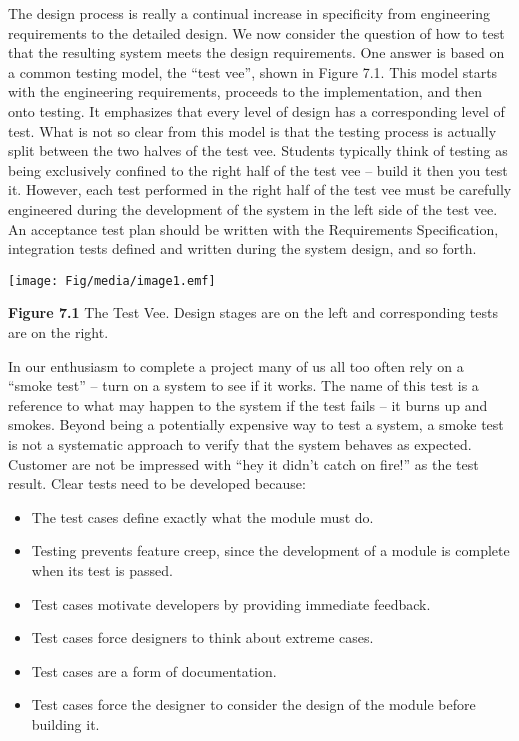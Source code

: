 The design process is really a continual increase in specificity from
engineering requirements to the detailed design. We now consider the
question of how to test that the resulting system meets the design
requirements. One answer is based on a common testing model, the ``test
vee'', shown in Figure 7.1. This model starts with the engineering
requirements, proceeds to the implementation, and then onto testing. It
emphasizes that every level of design has a corresponding level of test.
What is not so clear from this model is that the testing process is
actually split between the two halves of the test vee. Students
typically think of testing as being exclusively confined to the right
half of the test vee -- build it then you test it. However, each test
performed in the right half of the test vee must be carefully engineered
during the development of the system in the left side of the test vee.
An acceptance test plan should be written with the Requirements
Specification, integration tests defined and written during the system
design, and so forth.

\texttt{[image: Fig/media/image1.emf]}

\textbf{Figure 7.1} The Test Vee. Design stages are on the left and
corresponding tests are on the right.

In our enthusiasm to complete a project many of us all too often rely on
a ``smoke test'' -- turn on a system to see if it works. The name of
this test is a reference to what may happen to the system if the test
fails -- it burns up and smokes. Beyond being a potentially expensive
way to test a system, a smoke test is not a systematic approach to
verify that the system behaves as expected. Customer are not be
impressed with ``hey it didn't catch on fire!'' as the test result.
Clear tests need to be developed because:

\begin{itemize}
\item
  The test cases define exactly what the module must do.
\item
  Testing prevents feature creep, since the development of a module is
  complete when its test is passed.
\item
  Test cases motivate developers by providing immediate feedback.
\item
  Test cases force designers to think about extreme cases.
\item
  Test cases are a form of documentation.
\item
  Test cases force the designer to consider the design of the module
  before building it.
\end{itemize}

